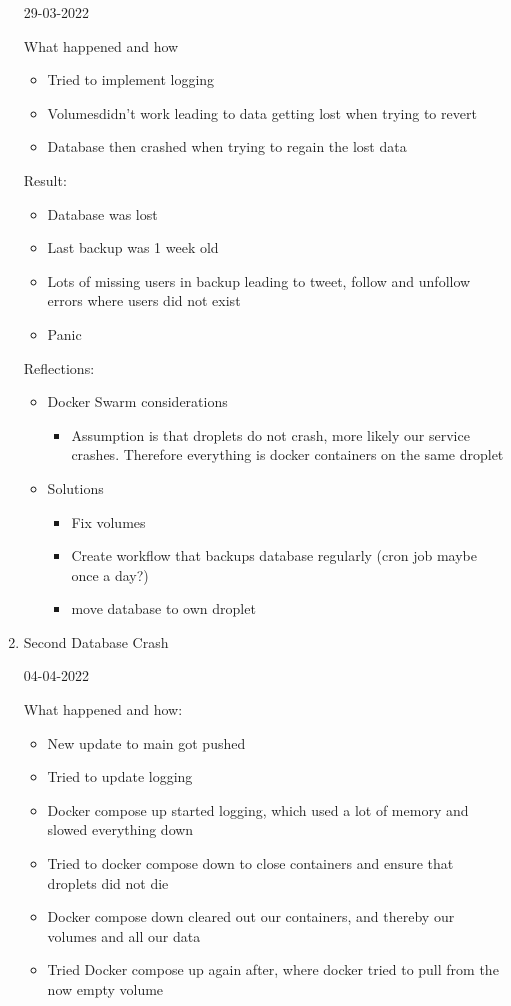 \begin{enumerate}
    29-03-2022

    What happened and how
    \begin{itemize}
        \item Tried to implement logging
        \item Volumesdidn’t work leading to data getting lost when trying to revert
        \item Database then crashed when trying to regain the lost data
    \end{itemize}
   
    Result:
    \begin{itemize}
        \item Database was lost
        \item Last backup was 1 week old
        \item Lots of missing users in backup leading to tweet, follow and unfollow errors where users did not exist
        \item Panic
    \end{itemize}
    
    
    Reflections:
    \begin{itemize}
        \item Docker Swarm considerations
        \begin{itemize}
            \item Assumption is that droplets do not crash, more likely our service crashes. Therefore everything is docker containers on the same droplet
        \end{itemize}
        \item Solutions
        \begin{itemize}
            \item Fix volumes
            \item Create workflow that backups database regularly (cron job maybe once a day?)
            \item move database to own droplet
        \end{itemize}
    \end{itemize}
    
    \item Second Database Crash
    
    04-04-2022

    What happened and how:
    \begin{itemize}
        \item New update to main got pushed
        \item Tried to update logging
        \item Docker compose up started logging, which used a lot of memory and slowed everything down
        \item Tried to docker compose down to close containers and ensure that droplets did not die
        \item Docker compose down cleared out our containers, and thereby our volumes and all our data
        \item Tried Docker compose up again after, where docker tried to pull from the now empty volume
    \end{itemize}
    

\end{enumerate}
